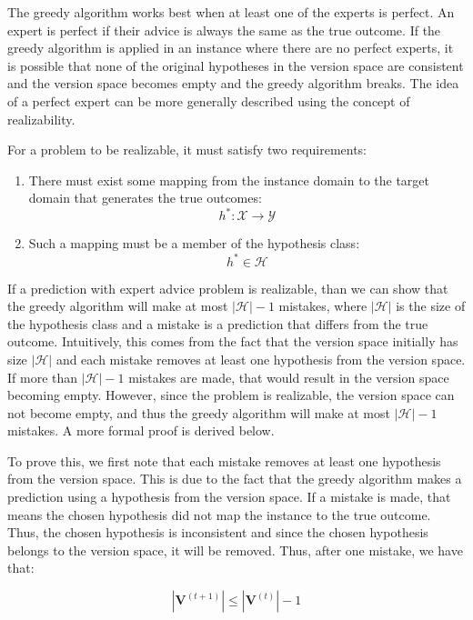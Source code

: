 \documentclass[11pt]{article}
\begin{document}
The greedy algorithm works best when at least one of the experts is perfect. An expert is perfect if their advice is always the same as the true outcome. If the greedy algorithm is applied in an instance where there are no perfect experts, it is possible that none of the original hypotheses in the version space are consistent and the version space becomes empty and the greedy algorithm breaks. The idea of a perfect expert can be more generally described using the concept of realizability. 

For a problem to be realizable, it must satisfy two requirements: 
\begin{enumerate}
  \item There must exist some mapping from the instance domain to the target domain that generates the true outcomes:
    $$h^* : \mathcal{X} \to \mathcal{Y}$$
  \item Such a mapping must be a member of the hypothesis class:
  $$ h^* \in \mathcal{H}$$
\end{enumerate}

If a prediction with expert advice problem is realizable, than we can show that the greedy algorithm will make at most $|\mathcal{H}|-1$ mistakes, where $|\mathcal{H}|$ is the size of the hypothesis class and a mistake is a prediction that differs from the true outcome. Intuitively, this comes from the fact that the version space initially has size $|\mathcal{H}|$ and each mistake removes at least one hypothesis from the version space. If more than $|\mathcal{H}|-1$ mistakes are made, that would result in the version space becoming empty. However, since the problem is realizable, the version space can not become empty, and thus the greedy algorithm will make at most $|\mathcal{H}|-1$ mistakes. A more formal proof is derived below. 


\normalfont
To prove this, we first note that each mistake removes at least one hypothesis from the version space. This is due to the fact that the greedy algorithm makes a prediction using a hypothesis from the version space. If a mistake is made, that means the chosen hypothesis did not map the instance to the true outcome. Thus, the chosen hypothesis is inconsistent and since the chosen hypothesis belongs to the version space, it will be removed. Thus, after one mistake, we have that:

$$|\textbf{V}^{(t+1)}| \leq |\textbf{V}^{(t)}| - 1$$
\end{document}
